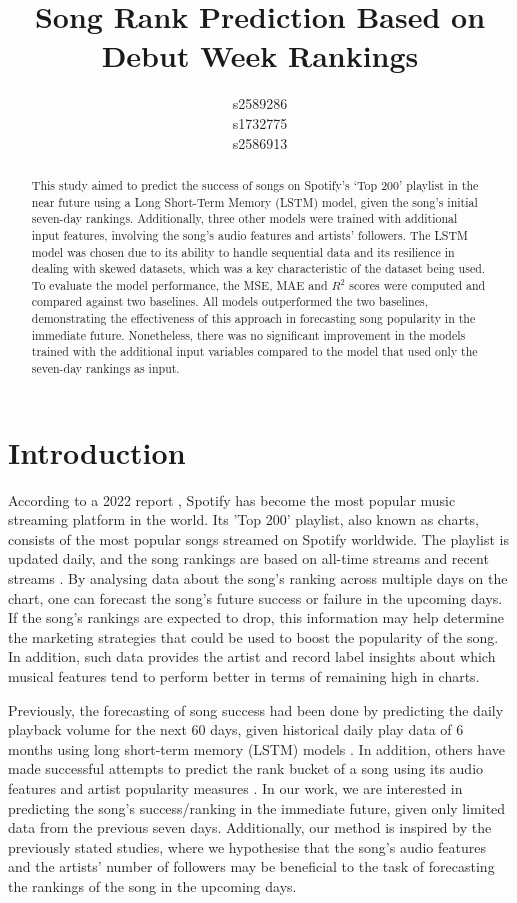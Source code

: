 \documentclass{article}
\title{Song Rank Prediction Based on Debut Week Rankings}
\author{
  s2589286\\
  \And
  s1732775\\
 \And
  s2586913\\
}
\begin{document}
\maketitle


\begin{abstract}
    This study aimed to predict the success of songs on Spotify’s ‘Top 200’ playlist in the near future using a Long Short-Term Memory (LSTM) model, given the song's initial seven-day rankings. Additionally, three other models were trained with additional input features, involving the song's audio features and artists' followers.
    The LSTM model was chosen due to its ability to handle sequential data and its resilience in dealing with skewed datasets, which was a key characteristic of the dataset being used. To evaluate the model performance, the MSE, MAE and $R^2$ scores were computed and compared against two baselines. All models outperformed the two baselines, demonstrating the effectiveness of this approach in forecasting song popularity in the immediate future. Nonetheless, there was no significant improvement in the models trained with the additional input variables compared to the model that used only the seven-day rankings as input.
    
\end{abstract}

\section{Introduction}
According to a 2022 report \cite{spotify_statistics}, Spotify has become the most popular music streaming platform in the world. Its 'Top 200' playlist, also known as charts, consists of the most popular songs streamed on Spotify worldwide. The playlist is updated daily, and the song rankings are based on all-time streams and recent streams \cite{spotifyGeneratePopular}. 
By analysing data about the song's ranking across multiple days on the chart, one can forecast the song's future success or failure in the upcoming days. If the song's rankings are expected to drop, this information may help determine the marketing strategies that could be used to boost the popularity of the song. In addition, such data provides the artist and record label insights about which musical features tend to perform better in terms of remaining high in charts. 

Previously, the forecasting of song success had been done by predicting the daily playback volume for the next 60 days, given historical daily play data of 6 months using long short-term memory (LSTM) models \cite{LSTM_Wang}\cite{LSTM_Random_Forest}. In addition, others have made successful attempts to predict the rank bucket of a song using its audio features and artist popularity measures \cite{sharmaSongPopularity}. In our work, we are interested in predicting the song's success/ranking in the immediate future, given only limited data from the previous seven days. Additionally, our method is inspired by the previously stated studies, where we hypothesise that the song's audio features and the artists' number of followers may be beneficial to the task of forecasting the rankings of the song in the upcoming days.
\end{document}
